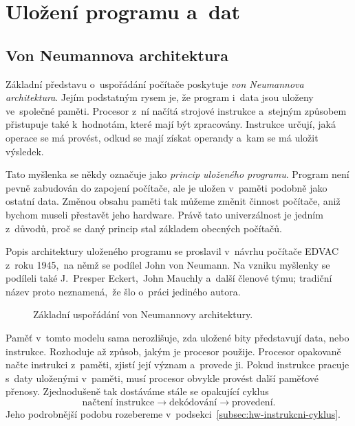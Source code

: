 \section{Uložení programu a~dat}\label{sec:hw-architektury}

\subsection{Von Neumannova architektura}

Základní představu o~uspořádání počítače poskytuje \emph{von Neumannova architektura}. Jejím podstatným rysem je, že program i~data jsou uloženy ve~společné paměti. Procesor z~ní načítá strojové instrukce a~stejným způsobem přistupuje také k~hodnotám, které mají být zpracovány. Instrukce určují, jaká operace se má provést, odkud se mají získat operandy a~kam se má uložit výsledek.

Tato myšlenka se někdy označuje jako \emph{princip uloženého programu}. Program není pevně zabudován do zapojení počítače, ale je uložen v~paměti podobně jako ostatní data. Změnou obsahu paměti tak můžeme změnit činnost počítače, aniž bychom museli přestavět jeho hardware. Právě tato univerzálnost je jedním z~důvodů, proč se daný princip stal základem obecných počítačů.

\begin{remark}
    Popis architektury uloženého programu se proslavil v~návrhu počítače EDVAC z~roku 1945,~na němž se podílel John von Neumann. Na vzniku myšlenky se podíleli také J.~Presper Eckert,~John Mauchly a~další členové týmu; tradiční název proto neznamená,~že šlo o~práci jediného autora.
\end{remark}

\begin{figure}[ht]
    \centering
    
    \caption{Základní uspořádání von Neumannovy architektury.}
    \label{fig:hw-von-neumann}
\end{figure}

Paměť v~tomto modelu sama nerozlišuje, zda uložené bity představují data, nebo instrukce. Rozhoduje až způsob, jakým je procesor použije. Procesor opakovaně načte instrukci z~paměti, zjistí její význam a~provede ji. Pokud instrukce pracuje s~daty uloženými v~paměti, musí procesor obvykle provést další paměťové přenosy. Zjednodušeně tak dostáváme stále se opakující cyklus
\[
    \text{načtení instrukce}
    \longrightarrow
    \text{dekódování}
    \longrightarrow
    \text{provedení}.
\]
Jeho podrobnější podobu rozebereme v~podsekci~\ref{subsec:hw-instrukcni-cyklus}.

